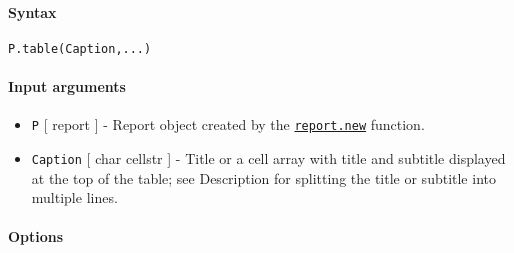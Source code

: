 


	\paragraph{Syntax}

\begin{verbatim}
P.table(Caption,...)
\end{verbatim}

\paragraph{Input arguments}

\begin{itemize}
\item
  \texttt{P} {[} report {]} - Report object created by the
  \href{report/new}{\texttt{report.new}} function.
\item
  \texttt{Caption} {[} char \textbar{} cellstr {]} - Title or a cell
  array with title and subtitle displayed at the top of the table; see
  Description for splitting the title or subtitle into multiple lines.
\end{itemize}

\paragraph{Options}

